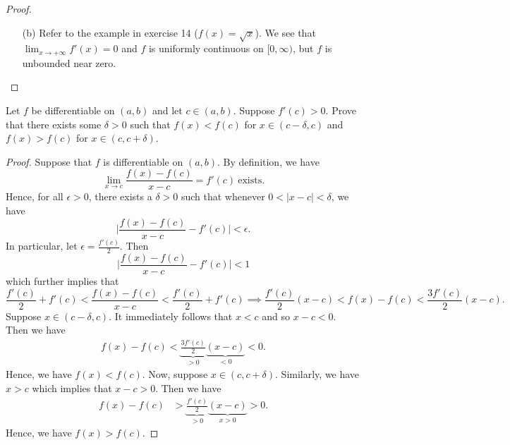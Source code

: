 \documentclass[a4paper]{article}
\begin{document}
\begin{proof}
\begin{enumerate}
\begin{enumerate}
            \item[(I)] Let \( x,y \in [0,R] \). Then suppose \( |  x- y  |  < \delta < {\delta}_{1} \). From (1), we can conclude that \( f \) is uniformly continuous.
            \item[(II)] Let \( x,y \in [R,+\infty) \). Then suppose \( | x- y  |  < \delta < {\delta}_{2} \). From (3), we can conclude that \( f  \) is uniformly continuous.
            \item[(III)] Let \( x \in [0,R] \) and \( y \in [R,+\infty) \). Then whenever \( |  x - y  | < \delta < 1  \), we can conclude that \( x,y \in [R-1, R+1] \). Then \( |  x- y  |  < \delta < {\delta}_{3} \) implies that 
                \[  | f(x) - f(y) |  < \epsilon. \]
                Hence, \( f  \) is uniformly continuous.
        \end{enumerate}
    \item[(b)] Refer to the example in exercise 14 (\( f(x) = \sqrt{ x }  \)). We see that \( \lim_{ x \to +\infty  } f'(x) = 0  \) and \( f  \) is uniformly continuous on \( [0,\infty) \), but \( f  \) is unbounded near zero. 
\end{enumerate}
\end{proof}

\begin{problem}
    Let \( f  \) be differentiable on \( (a,b) \) and let \( c \in (a,b) \). Suppose \( f'(c) > 0  \). Prove that there exists some \( \delta > 0  \) such that \( f(x) < f(c) \) for \( x \in (c - \delta, c) \) and \( f(x) > f(c) \) for \( x \in (c, c + \delta) \).
\end{problem}
\begin{proof}
Suppose that \( f  \) is differentiable on \( (a,b) \). By definition, we have 
\[  \lim_{ x \to c }  \frac{ f(x) - f(c) }{  x - c  } = f'(c)  \ \text{exists}. \]
Hence, for all \( \epsilon > 0  \), there exists a \( \delta > 0  \) such that whenever \( 0 < |  x - c  |  < \delta \), we have 
\[  \Big| \frac{ f(x) - f(c) }{ x - c  }  - f'(c) \Big| < \epsilon. \]
In particular, let \( \epsilon = \frac{ f'(c) }{ 2 }   \). Then  
\[  \Big| \frac{ f(x) - f(c) }{  x - c  }  - f'(c) \Big| < 1 \tag{*}  \]
which further implies that 
\[  \frac{ f'(c)   }{ 2 }  + f'(c) < \frac{ f(x) - f(c) }{ x - c  }  < \frac{ f'(c) }{ 2 }  + f'(c) \implies \frac{ f'(c)   }{ 2 } (x-c) < f(x) - f(c) < \frac{ 3 f'(c) }{ 2 }  (x - c).  \]
Suppose \( x \in (c-\delta, c) \). It immediately follows that \( x < c  \) and so \( x - c < 0  \). Then we have 
\begin{align*}
    f(x) - f(c) < \underbrace{\frac{ 3 f'(c) }{ 2  }}_{>0}  \underbrace{(x - c)}_{<0} 
                < 0.
\end{align*}
Hence, we have \( f(x) < f(c) \). Now, suppose \( x \in (c , c + \delta) \). Similarly, we have \( x > c  \) which implies that \( x - c > 0  \). Then we have 
\begin{align*}
    f(x) - f(c )&> \underbrace{\frac{ f'(c) }{ 2  }}_{>0}  \underbrace{(x - c)}_{x > 0} 
                > 0.
\end{align*}
Hence, we have \( f(x) > f(c) \).
\end{proof} 
\end{document}

